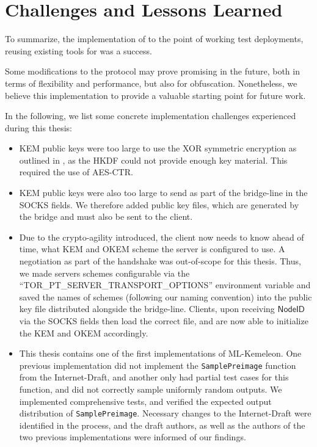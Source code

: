 \section{Challenges and Lessons Learned} \label{sec:challenges-learnings}

To summarize, the implementation of \drivel{} to the point of working test deployments, reusing existing tools for \obfsfour{} was a success.

Some modifications to the protocol may prove promising in the future, both in terms of flexibility and performance, but also for obfuscation. Nonetheless, we believe this implementation to provide a valuable starting point for future work.

In the following, we list some concrete implementation challenges experienced during this thesis:
\begin{itemize}
    \item KEM public keys were too large to use the XOR symmetric encryption as outlined in \cite{EPRINT:GRSV25}, as the HKDF could not provide enough key material. This required the use of AES-CTR.

    \item KEM public keys were also too large to send as part of the bridge-line in the SOCKS fields. We therefore added public key files, which are generated by the bridge and must also be sent to the client.

    \item Due to the crypto-agility introduced, the client now needs to know ahead of time, what KEM and OKEM scheme the server is configured to use. A negotiation as part of the handshake was out-of-scope for this thesis. Thus, we made servers schemes configurable via the ``TOR\_PT\_SERVER\_TRANSPORT\_OPTIONS'' environment variable and saved the names of schemes (following our naming convention) into the public key file distributed alongside the bridge-line. Clients, upon receiving $\mathsf{NodeID}$ via the SOCKS fields then load the correct file, and are now able to initialize the KEM and OKEM accordingly.

    \item This thesis contains one of the first implementations of ML-Kemeleon. One previous implementation \cite{ct-kemeleon} did not implement the \texttt{SamplePreimage} function from the Internet-Draft, and another \cite{jmwample-kemeleon} only had partial test cases for this function, and did not correctly sample uniformly random outputs. We implemented comprehensive tests, and verified the expected output distribution of \texttt{SamplePreimage}. Necessary changes to the Internet-Draft were identified in the process, and the draft authors, as well as the authors of the two previous implementations were informed of our findings.


\end{itemize}
